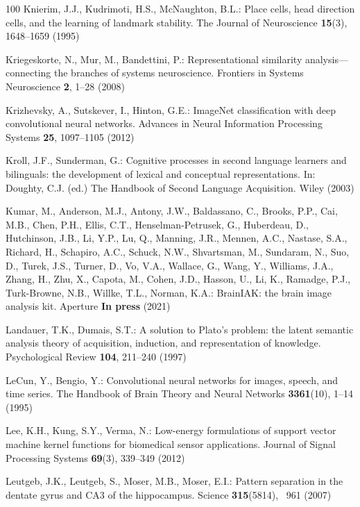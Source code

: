 \documentclass{llmxive}
\begin{document}
\begin{thebibliography}{100}
Knierim, J.J., Kudrimoti, H.S., McNaughton, B.L.: Place cells, head direction
  cells, and the learning of landmark stability. The Journal of Neuroscience
  \textbf{15}(3),  1648--1659 (1995)

Kriegeskorte, N., Mur, M., Bandettini, P.: Representational similarity
  analysis--- connecting the branches of systems neuroscience. Frontiers in
  Systems Neuroscience  \textbf{2},  1--28 (2008)

Krizhevsky, A., Sutskever, I., Hinton, G.E.: {ImageNet} classification with
  deep convolutional neural networks. Advances in Neural Information Processing
  Systems  \textbf{25},  1097--1105 (2012)

Kroll, J.F., Sunderman, G.: Cognitive processes in second language learners and
  bilinguals: the development of lexical and conceptual representations. In:
  Doughty, C.J. (ed.) The Handbook of Second Language Acquisition. Wiley (2003)

Kumar, M., Anderson, M.J., Antony, J.W., Baldassano, C., Brooks, P.P., Cai,
  M.B., Chen, P.H., Ellis, C.T., Henselman-Petrusek, G., Huberdeau, D.,
  Hutchinson, J.B., Li, Y.P., Lu, Q., Manning, J.R., Mennen, A.C., Nastase,
  S.A., Richard, H., Schapiro, A.C., Schuck, N.W., Shvartsman, M., Sundaram,
  N., Suo, D., Turek, J.S., Turner, D., Vo, V.A., Wallace, G., Wang, Y.,
  Williams, J.A., Zhang, H., Zhu, X., Capota, M., Cohen, J.D., Hasson, U., Li,
  K., Ramadge, P.J., Turk-Browne, N.B., Willke, T.L., Norman, K.A.: {BrainIAK}:
  the brain image analysis kit. Aperture  \textbf{In press} (2021)

Landauer, T.K., Dumais, S.T.: A solution to {P}lato's problem: the latent
  semantic analysis theory of acquisition, induction, and representation of
  knowledge. Psychological Review  \textbf{104},  211--240 (1997)

LeCun, Y., Bengio, Y.: Convolutional neural networks for images, speech, and
  time series. The Handbook of Brain Theory and Neural Networks
  \textbf{3361}(10),  1--14 (1995)

Lee, K.H., Kung, S.Y., Verma, N.: Low-energy formulations of support vector
  machine kernel functions for biomedical sensor applications. Journal of
  Signal Processing Systems  \textbf{69}(3),  339--349 (2012)

Leutgeb, J.K., Leutgeb, S., Moser, M.B., Moser, E.I.: Pattern separation in the
  dentate gyrus and {CA3} of the hippocampus. Science  \textbf{315}(5814), ~961
  (2007)


\end{thebibliography}
\end{document}

